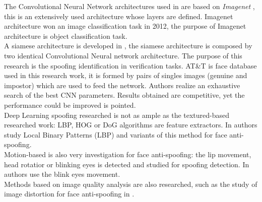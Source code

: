 The Convolutional Neural Network architectures used in \cite{yangLL14,LSTM-CNN} are based on \textit{Imagenet} \cite{imagenet}, this is an extensively used architecture whose layers are defined. Imagenet architecture won an image classification task in 2012, the purpose of Imagenet architecture is object classification task.\\

A siamese architecture is developed in \cite{Verification}, the siamese architecture is composed by two identical Convolutional Neural network architecture. The purpose of this research is the spoofing identification in verification tasks. AT\&T is face database used in this research work, it is formed by pairs of singles images (genuine and impostor) which are used to feed the network.  Authors realize an exhaustive search of the best CNN parameters. Results obtained are competitive, yet the performance could be improved is pointed.\\

Deep Learning spoofing researched is not as ample as the textured-based researched work: LBP, HOG or DoG algorithms are feature extractors. In \cite{LBP_FaceAnti} authors study Local Binary Patterns (LBP) and variants of this method for face anti-spoofing.\\

Motion-based is also very investigation for face anti-spoofing: the lip movement, head rotatior or blinking eyes is detected and studied for spoofing detection. In \cite{Blink_antispoofing} authors use the blink eyes movement.\\

Methods based on image quality analysis are also researched, such as the study of image distortion for face anti-spoofing in \cite{MSUdatabse}.\\





